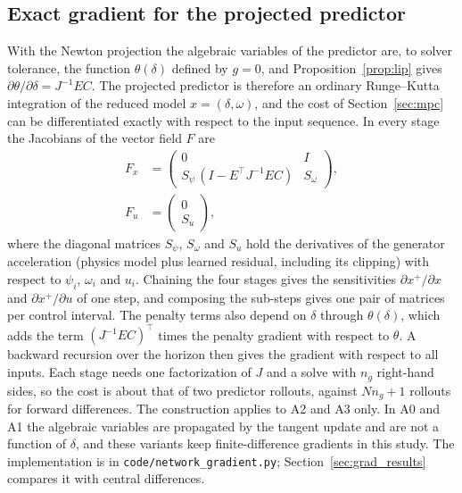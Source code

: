 \documentclass[preprint,12pt]{elsarticle}
\begin{document}
\subsection{Exact gradient for the projected predictor}
\label{sec:grad}
With the Newton projection the algebraic variables of the predictor are, to solver tolerance, the function $\theta(\delta)$ defined by $g=0$, and Proposition~\ref{prop:lip} gives $\partial\theta/\partial\delta=J^{-1}EC$. The projected predictor is therefore an ordinary Runge--Kutta integration of the reduced model $x=(\delta,\omega)$, and the cost of Section~\ref{sec:mpc} can be differentiated exactly with respect to the input sequence. In every stage the Jacobians of the vector field $F$ are
\begin{equation}
\begin{split}F_x&=\begin{pmatrix}0&I\\ S_\psi\,(I-E^\top J^{-1}EC)&S_\omega\end{pmatrix},\\ F_u&=\begin{pmatrix}0\\ S_u\end{pmatrix},\end{split}
\label{eq:stagejac}
\end{equation}
where the diagonal matrices $S_\psi$, $S_\omega$ and $S_u$ hold the derivatives of the generator acceleration (physics model plus learned residual, including its clipping) with respect to $\psi_i$, $\omega_i$ and $u_i$. Chaining the four stages gives the sensitivities $\partial x^{+}/\partial x$ and $\partial x^{+}/\partial u$ of one step, and composing the sub-steps gives one pair of matrices per control interval. The penalty terms also depend on $\delta$ through $\theta(\delta)$, which adds the term $(J^{-1}EC)^\top$ times the penalty gradient with respect to $\theta$. A backward recursion over the horizon then gives the gradient with respect to all inputs. Each stage needs one factorization of $J$ and a solve with $n_g$ right-hand sides, so the cost is about that of two predictor rollouts, against $N n_g+1$ rollouts for forward differences. The construction applies to A2 and A3 only. In A0 and A1 the algebraic variables are propagated by the tangent update and are not a function of $\delta$, and these variants keep finite-difference gradients in this study. The implementation is in \texttt{code/network\_gradient.py}; Section~\ref{sec:grad_results} compares it with central differences.
\end{document}
